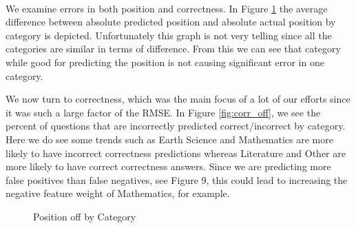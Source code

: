 \documentclass[letterpaper]{article}
\begin{document}
\paragraph{} We examine errors in both position and correctness.  In Figure \ref{fig:abs_off} the average difference between absolute predicted position and absolute actual position by category is depicted.  Unfortunately this graph is not very telling since all the categories are similar in terms of difference.  From this we can see that category while good for predicting the position is not causing significant error in one category.

We now turn to correctness, which was the main focus of a lot of our efforts since it was such a large factor of the RMSE.  In Figure \ref{fig:corr_off}, we see the percent of questions that are incorrectly predicted correct/incorrect by category.  Here we do see some trends such as Earth Science and Mathematics are more likely to have incorrect correctness predictions whereas Literature and Other are more likely to have correct correctness answers.  Since we are predicting more false positives than false negatives, see Figure 9, this could lead to increasing the negative feature weight of Mathematics, for example.



\begin{figure}[H]
	\begin{center}
	\end{center}
	\caption{Position off by Category}
	\label{fig:abs_off}
\end{figure}
\end{document}
